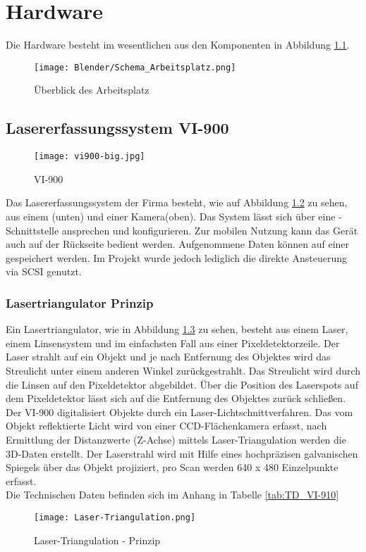 \chapter{Hardware}
\label{sec:Hardware}
Die Hardware besteht im wesentlichen aus den Komponenten in Abbildung \ref{fig:Übersicht}.
\begin{figure}[htb]
\centering
\texttt{[image: Blender/Schema\_Arbeitsplatz.png]}
\caption{Überblick des Arbeitsplatz}
\label{fig:Übersicht}
\end{figure}

\section{Lasererfassungssystem VI-900}
\begin{figure}[htb]
\centering
\texttt{[image: vi900-big.jpg]}
\caption{VI-900}
\label{fig:VI900}
\end{figure}
Das Lasererfassungssystem  der Firma  besteht, wie auf Abbildung \ref{fig:VI900} zu sehen, aus einem (unten) und einer Kamera(oben). Das System lässt sich über eine -Schnittstelle ansprechen und konfigurieren. Zur mobilen Nutzung kann das Gerät auch auf der Rückseite bedient werden. Aufgenommene Daten können auf einer  gespeichert werden. Im Projekt wurde jedoch lediglich die direkte Ansteuerung via SCSI genutzt.
\subsection{Lasertriangulator Prinzip}
Ein Lasertriangulator, wie in Abbildung \ref{fig:LaserTriangulator} zu sehen, besteht aus einem Laser, einem Linsensystem und im einfachsten Fall aus einer Pixeldetektorzeile. Der Laser strahlt auf ein Objekt und je nach Entfernung des Objektes wird das Streulicht unter einem anderen Winkel zurückgestrahlt. Das Streulicht wird durch die Linsen auf den Pixeldetektor abgebildet. Über die Position des Laserspots auf dem Pixeldetektor lässt sich auf die Entfernung des Objektes zurück schließen.\\
Der VI-900 digitalisiert Objekte durch ein Laser-Lichtschnittverfahren. Das vom Objekt reflektierte Licht wird von einer CCD-Flächenkamera erfasst, nach Ermittlung der Distanzwerte (Z-Achse) mittels Laser-Triangulation werden die 3D-Daten erstellt. Der Laserstrahl wird mit Hilfe eines hochpräzisen galvanischen Spiegels über das Objekt projiziert, pro Scan werden 640 x 480 Einzelpunkte erfasst.\cite{Minolta:Einleitung}\\
Die Technischen Daten befinden sich im Anhang in Tabelle \ref{tab:TD_VI-910}
\begin{figure}[htb]
\centering
\texttt{[image: Laser-Triangulation.png]}
\caption{Laser-Triangulation - Prinzip}
\label{fig:LaserTriangulator}
\end{figure}
